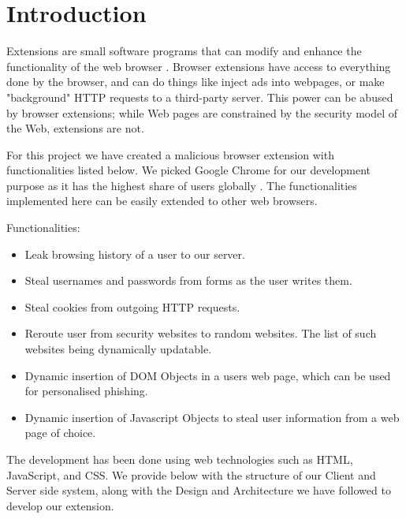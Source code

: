 \chapter{Introduction}
\par Extensions are small software programs that can modify and enhance the functionality of the web browser \cite{chromegetstarted}. Browser extensions have access to everything done by the browser, and can do things like inject ads into webpages, or make "background" HTTP requests to a third-party server. This power can be abused by browser extensions; while Web pages are constrained by the security model of the Web, extensions are not.


\par For this project we have created a malicious  browser extension with functionalities listed below. We picked Google Chrome for our development purpose as it has the highest share of users globally \cite{topbrowserusage}. The functionalities implemented here can be easily extended to other web browsers.

Functionalities: 
\begin{itemize}
  \item Leak browsing history of a user to our server.
  \item Steal usernames and passwords from forms as the user writes them.
  \item Steal cookies from outgoing HTTP requests.
  \item Reroute user from security websites to random websites. The list of such websites being dynamically updatable.
  \item Dynamic insertion of DOM Objects in a users web page, which can be used for personalised phishing.
  \item Dynamic insertion of Javascript Objects to steal user information from a web page of choice.
\end{itemize}


The development has been done using web technologies such as HTML, JavaScript, and CSS. We provide below with the structure of our Client and Server side system, along with the Design and Architecture we have followed to develop our extension.